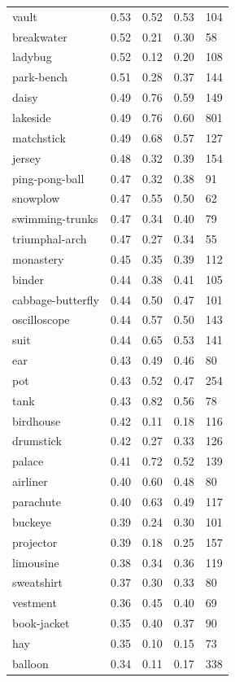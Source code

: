 \begin{center}
\begin{longtable}{lllll}
vault & 0.53 & 0.52 & 0.53 & 104 \\
breakwater & 0.52 & 0.21 & 0.30 & 58 \\
ladybug & 0.52 & 0.12 & 0.20 & 108 \\
park-bench & 0.51 & 0.28 & 0.37 & 144 \\
daisy & 0.49 & 0.76 & 0.59 & 149 \\
lakeside & 0.49 & 0.76 & 0.60 & 801 \\
matchstick & 0.49 & 0.68 & 0.57 & 127 \\
jersey & 0.48 & 0.32 & 0.39 & 154 \\
ping-pong-ball & 0.47 & 0.32 & 0.38 & 91 \\
snowplow & 0.47 & 0.55 & 0.50 & 62 \\
swimming-trunks & 0.47 & 0.34 & 0.40 & 79 \\
triumphal-arch & 0.47 & 0.27 & 0.34 & 55 \\
monastery & 0.45 & 0.35 & 0.39 & 112 \\
binder & 0.44 & 0.38 & 0.41 & 105 \\
cabbage-butterfly & 0.44 & 0.50 & 0.47 & 101 \\
oscilloscope & 0.44 & 0.57 & 0.50 & 143 \\
suit & 0.44 & 0.65 & 0.53 & 141 \\
ear & 0.43 & 0.49 & 0.46 & 80 \\
pot & 0.43 & 0.52 & 0.47 & 254 \\
tank & 0.43 & 0.82 & 0.56 & 78 \\
birdhouse & 0.42 & 0.11 & 0.18 & 116 \\
drumstick & 0.42 & 0.27 & 0.33 & 126 \\
palace & 0.41 & 0.72 & 0.52 & 139 \\
airliner & 0.40 & 0.60 & 0.48 & 80 \\
parachute & 0.40 & 0.63 & 0.49 & 117 \\
buckeye & 0.39 & 0.24 & 0.30 & 101 \\
projector & 0.39 & 0.18 & 0.25 & 157 \\
limousine & 0.38 & 0.34 & 0.36 & 119 \\
sweatshirt & 0.37 & 0.30 & 0.33 & 80 \\
vestment & 0.36 & 0.45 & 0.40 & 69 \\
book-jacket & 0.35 & 0.40 & 0.37 & 90 \\
hay & 0.35 & 0.10 & 0.15 & 73 \\
balloon & 0.34 & 0.11 & 0.17 & 338 \\

\end{longtable}
\end{center}
